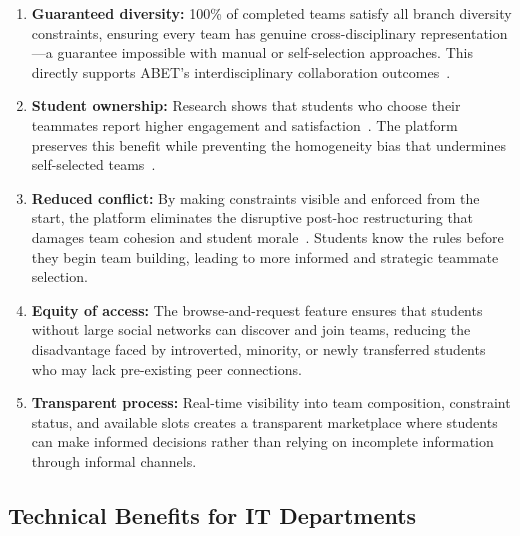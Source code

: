 \documentclass[conference]{IEEEtran}
\begin{document}
\begin{enumerate}[noitemsep,topsep=3pt]
    \item \textbf{Guaranteed diversity:} 100\% of completed teams satisfy all branch diversity constraints, ensuring every team has genuine cross-disciplinary representation---a guarantee impossible with manual or self-selection approaches. This directly supports ABET's interdisciplinary collaboration outcomes~\cite{abet2019}.

    \item \textbf{Student ownership:} Research shows that students who choose their teammates report higher engagement and satisfaction~\cite{chapman2006}. The platform preserves this benefit while preventing the homogeneity bias that undermines self-selected teams~\cite{bacon2004}.

    \item \textbf{Reduced conflict:} By making constraints visible and enforced from the start, the platform eliminates the disruptive post-hoc restructuring that damages team cohesion and student morale~\cite{oakley2004}. Students know the rules before they begin team building, leading to more informed and strategic teammate selection.

    \item \textbf{Equity of access:} The browse-and-request feature ensures that students without large social networks can discover and join teams, reducing the disadvantage faced by introverted, minority, or newly transferred students who may lack pre-existing peer connections.

    \item \textbf{Transparent process:} Real-time visibility into team composition, constraint status, and available slots creates a transparent marketplace where students can make informed decisions rather than relying on incomplete information through informal channels.
\end{enumerate}

\subsection{Technical Benefits for IT Departments}
\end{document}
